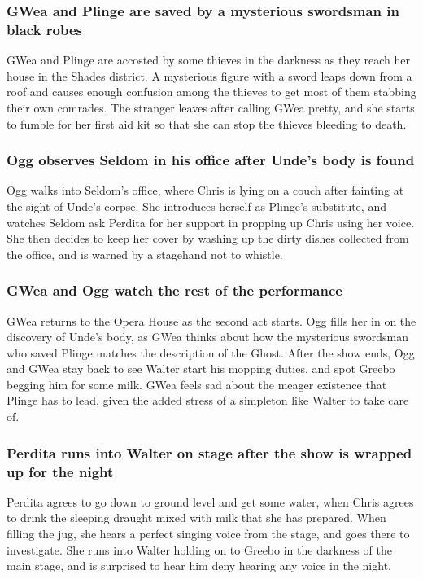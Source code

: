 \subsubsection{\Gls{GWea} and \Gls{Plinge} are saved by a mysterious swordsman in black robes}
\Gls{GWea} and \Gls{Plinge} are accosted by some thieves in the darkness as they reach her house in
the Shades district. A mysterious figure with a sword leaps down from a roof and causes enough
confusion among the thieves to get most of them stabbing their own comrades. The stranger leaves
after calling \Gls{GWea} pretty, and she starts to fumble for her first aid kit so that she can stop
the thieves bleeding to death.

\subsubsection{\Gls{Ogg} observes \Gls{Seldom} in his office after \Gls{Unde}'s body is found}
\Gls{Ogg} walks into \Gls{Seldom}'s office, where \Gls{Chris} is lying on a couch after fainting at
the sight of \Gls{Unde}'s corpse. She introduces herself as \Gls{Plinge}'s substitute, and watches
\Gls{Seldom} ask \Gls{Perdita} for her support in propping up \Gls{Chris} using her voice. She
then decides to keep her cover by washing up the dirty dishes collected from the office, and is
warned by a stagehand not to whistle.

\subsubsection{\Gls{GWea} and \Gls{Ogg} watch the rest of the performance}
\Gls{GWea} returns to the Opera House as the second act starts. \Gls{Ogg} fills her in on the
discovery of \Gls{Unde}'s body, as \Gls{GWea} thinks about how the mysterious swordsman who saved
\Gls{Plinge} matches the description of the \Gls{Ghost}. After the show ends, \Gls{Ogg} and
\Gls{GWea} stay back to see \Gls{Walter} start his mopping duties, and spot \Gls{Greebo} begging
him for some milk. \Gls{GWea} feels sad about the meager existence that \Gls{Plinge} has to lead,
given the added stress of a simpleton like \Gls{Walter} to take care of.

\subsubsection{\Gls{Perdita} runs into \Gls{Walter} on stage after the show is wrapped up for the
    night}
\Gls{Perdita} agrees to go down to ground level and get some water, when \Gls{Chris} agrees to
drink the sleeping draught mixed with milk that she has prepared. When filling the jug, she hears a
perfect singing voice from the stage, and goes there to investigate. She runs into \Gls{Walter}
holding on to \Gls{Greebo} in the darkness of the main stage, and is surprised to hear him deny
hearing any voice in the night.

